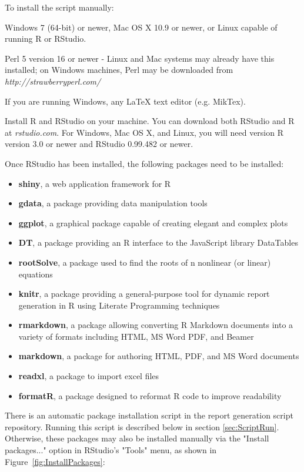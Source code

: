 \documentclass[conference]{IEEEtran}
\begin{document}
To install the script manually:
\begin{itemize}%
  \item {Windows 7 (64-bit) or newer, Mac OS X 10.9 or newer, or Linux capable of running R or RStudio.}
  \item {Perl 5 version 16 or newer - Linux and Mac systems may already have this installed; on Windows machines, Perl may be downloaded from \textit{http://strawberryperl.com/}}
  \item{If you are running Windows, any LaTeX text editor (e.g. MikTex).}
  \item {Install R and RStudio on your machine. You can download both RStudio and R at \textit{rstudio.com}. For Windows, Mac OS X, and Linux, you will need version R version 3.0 or newer and RStudio 0.99.482 or newer.
  \item {Once RStudio has been installed, the following packages need to be installed:
        \begin{itemize}
          \item {\textbf{shiny}, a web application framework for R}
          \item {\textbf{gdata}, a package providing data manipulation tools}
          \item {\textbf{ggplot}, a graphical package capable of creating elegant and complex plots}
          \item {\textbf{DT}, a package providing an R interface to the JavaScript library DataTables}
          \item {\textbf{rootSolve}, a package used to find the roots of n nonlinear (or linear) equations}
          \item {\textbf{knitr}, a package providing a general-purpose tool for dynamic report generation in R using Literate Programming techniques}
          \item {\textbf{rmarkdown}, a package allowing converting R Markdown documents into a variety of formats including HTML, MS Word PDF, and Beamer}
          \item {\textbf{markdown}, a package for authoring HTML, PDF, and MS Word documents}
          \item {\textbf{readxl}, a package to import excel files}
          \item {\textbf{formatR}, a package designed to reformat R code to improve readability}
        \end{itemize}
        } 
        \item {There is an automatic package installation script in the report generation script repository. Running this script is described below in section \ref{sec:ScriptRun}. Otherwise, these packages may also be installed manually via the "Install packages..." option in RStudio's "Tools" menu, as shown in Figure~\ref{fig:InstallPackages}:
}}
\end{itemize}
\end{document}
